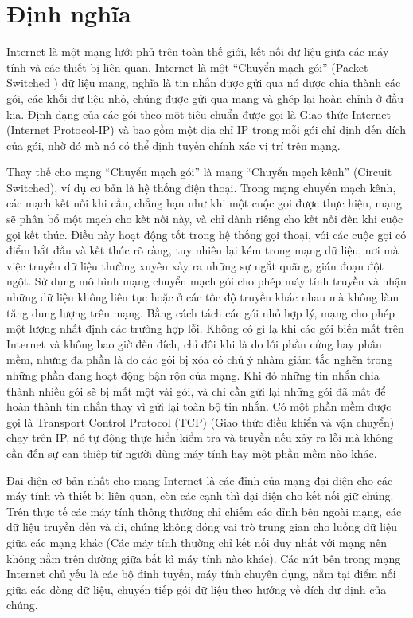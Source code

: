 \section{Định nghĩa}
Internet là một mạng lưới phủ trên toàn thế giới, kết nối dữ liệu giữa các máy tính và các thiết bị liên quan. Internet là một “Chuyển mạch gói” (Packet Switched ) dữ liệu mạng, nghĩa là tin nhắn được gửi qua nó được chia thành các gói, các khối dữ liệu nhỏ, chúng được gửi qua mạng và ghép lại hoàn chỉnh ở đầu kia. Định dạng của các gói theo một tiêu chuẩn được gọi là Giao thức Internet (Internet Protocol-IP) và bao gồm một địa chỉ IP trong mỗi gói chỉ định đến đích của gói, nhờ đó mà nó có thể định tuyến chính xác vị trí trên mạng.\par
Thay thế cho mạng “Chuyển mạch gói”  là mạng “Chuyển mạch kênh” (Circuit Switched), ví dụ cơ bản là hệ thống điện thoại. Trong mạng chuyển mạch kênh, các mạch kết nối khi cần, chẳng hạn như khi một cuộc gọi được thực hiện, mạng sẽ phân bổ một mạch cho kết nối này, và chỉ dành riêng cho kết nối đến khi cuộc gọi kết thúc. Điều này hoạt động tốt trong hệ thống gọi thoại, với các cuộc gọi có điểm bắt đầu và kết thúc rõ ràng, tuy nhiên lại kém trong mạng dữ liệu, nơi mà việc truyền dữ liệu thường xuyên xảy ra những sự ngắt quãng, gián đoạn đột ngột. Sử dụng mô hình mạng chuyển mạch gói cho phép máy tính truyền và nhận những dữ liệu không liên tục hoặc ở các tốc độ truyền khác nhau mà không làm tăng dung lượng trên mạng. Bằng cách tách các gói nhỏ hợp lý, mạng cho phép một lượng nhất định các trường hợp lỗi. Không có gì lạ khi các gói biến mất trên Internet và không bao giờ đến đích, chỉ đôi khi là do lỗi phần cứng hay phần mềm, nhưng đa phần là do các gói bị xóa có chủ ý nhàm giảm tắc nghẽn trong những phần đang hoạt động bận rộn của mạng. Khi đó những tin nhắn chia thành nhiều gói sẽ bị mất một vài gói, và chỉ cần gửi lại những gói đã mất để hoàn thành tin nhắn thay vì gửi lại toàn bộ tin nhắn. Có một phần mềm được gọi là Transport Control Protocol (TCP) (Giao thức điều khiển và vận chuyển) chạy trên IP, nó tự động thực hiển kiểm tra và truyền nếu xảy ra lỗi mà không cần đến sự can thiệp từ người dùng máy tính hay một phần mềm nào khác.\par
Đại diện cơ bản nhất cho mạng Internet là các đỉnh của mạng đại diện cho các máy tính và thiết bị liên quan, còn các cạnh thì đại diện cho kết nối giữ chúng. Trên thực tế các máy tính thông thường chỉ chiếm các đỉnh bên ngoài mạng, các dữ liệu truyền đến và đi, chúng không đóng vai trò trung gian cho luồng dữ liệu giữa các mạng khác (Các máy tính thường chỉ kết nối duy nhất với mạng nên không nằm trên đường giữa bất kì máy tính nào khác). Các nút bên trong mạng Internet chủ yếu là các bộ đinh tuyến, máy tính chuyên dụng, nằm tại điểm nối giữa các dòng dữ liệu, chuyển tiếp gói dữ liệu theo hướng về đích dự định của chúng.\par

